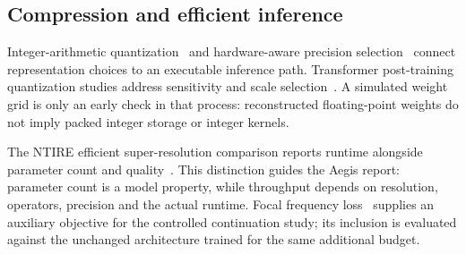 \subsection{Compression and efficient inference}
Integer-arithmetic quantization~\cite{Jacob_2018_CVPR} and hardware-aware
precision selection~\cite{Wang_2019_HAQ} connect representation choices to
an executable inference path. Transformer post-training quantization studies
address sensitivity and scale selection~\cite{Yuan_2022_PTQ4ViT,Li_2023_RepQ}.
A simulated weight grid is only an early check in that process: reconstructed
floating-point weights do not imply packed integer storage or integer kernels.

The NTIRE efficient super-resolution comparison reports runtime alongside
parameter count and quality~\cite{Ren_2025_CVPRW}. This distinction guides the
Aegis report: parameter count is a model property, while throughput depends
on resolution, operators, precision and the actual runtime. Focal frequency
loss~\cite{Jiang_2021_FFL} supplies an auxiliary objective for the controlled
continuation study; its inclusion is evaluated against the unchanged
architecture trained for the same additional budget.
